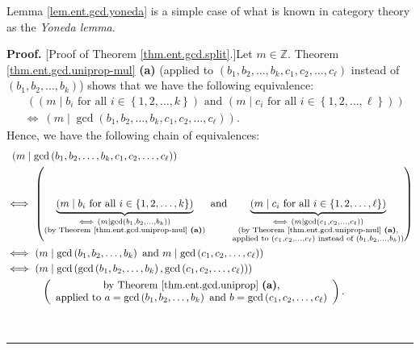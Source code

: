 \documentclass[numbers=enddot,12pt,final,onecolumn,notitlepage]{scrartcl}%
\numberwithin{exer}{subsection}
\theoremstyle{definition}
\newenvironment{proof}[1][Proof]{\noindent\textbf{#1.} }{\ \rule{0.5em}{0.5em}}
\begin{document}
Lemma \ref{lem.ent.gcd.yoneda} is a simple case of what is known in category
theory as the \textit{Yoneda lemma}.

\begin{proof}
[Proof of Theorem \ref{thm.ent.gcd.split}.]Let $m\in\mathbb{Z}$. Theorem
\ref{thm.ent.gcd.uniprop-mul} \textbf{(a)} (applied to $\left(  b_{1}%
,b_{2},\ldots,b_{k},c_{1},c_{2},\ldots,c_{\ell}\right)  $ instead of $\left(
b_{1},b_{2},\ldots,b_{k}\right)  $) shows that we have the following
equivalence:%
\begin{align*}
&  \ \left(  \left(  m\mid b_{i}\text{ for all }i\in\left\{  1,2,\ldots
,k\right\}  \right)  \text{ and }\left(  m\mid c_{i}\text{ for all }%
i\in\left\{  1,2,\ldots,\ell\right\}  \right)  \right) \\
&  \Longleftrightarrow\ \left(  m\mid\gcd\left(  b_{1},b_{2},\ldots
,b_{k},c_{1},c_{2},\ldots,c_{\ell}\right)  \right)  .
\end{align*}
Hence, we have the following chain of equivalences:%
\begin{align*}
&  \ \left(  m\mid\gcd\left(  b_{1},b_{2},\ldots,b_{k},c_{1},c_{2}%
,\ldots,c_{\ell}\right)  \right) \\
&  \Longleftrightarrow\ \left(  \underbrace{\left(  m\mid b_{i}\text{ for all
}i\in\left\{  1,2,\ldots,k\right\}  \right)  }_{\substack{\Longleftrightarrow
\ \left(  m\mid\gcd\left(  b_{1},b_{2},\ldots,b_{k}\right)  \right)
\\\text{(by Theorem \ref{thm.ent.gcd.uniprop-mul} \textbf{(a)})}}}\text{ and
}\underbrace{\left(  m\mid c_{i}\text{ for all }i\in\left\{  1,2,\ldots
,\ell\right\}  \right)  }_{\substack{\Longleftrightarrow\ \left(  m\mid
\gcd\left(  c_{1},c_{2},\ldots,c_{\ell}\right)  \right)  \\\text{(by Theorem
\ref{thm.ent.gcd.uniprop-mul} \textbf{(a)},}\\\text{applied to }\left(
c_{1},c_{2},\ldots,c_{\ell}\right)  \text{ instead of }\left(  b_{1}%
,b_{2},\ldots,b_{k}\right)  \text{)}}}\right) \\
&  \Longleftrightarrow\ \left(  m\mid\gcd\left(  b_{1},b_{2},\ldots
,b_{k}\right)  \text{ and }m\mid\gcd\left(  c_{1},c_{2},\ldots,c_{\ell
}\right)  \right) \\
&  \Longleftrightarrow\ \left(  m\mid\gcd\left(  \gcd\left(  b_{1}%
,b_{2},\ldots,b_{k}\right)  ,\gcd\left(  c_{1},c_{2},\ldots,c_{\ell}\right)
\right)  \right) \\
&  \ \ \ \ \ \ \ \ \ \ \left(
\begin{array}
[c]{c}%
\text{by Theorem \ref{thm.ent.gcd.uniprop} \textbf{(a)},}\\
\text{applied to }a=\gcd\left(  b_{1},b_{2},\ldots,b_{k}\right)  \text{ and
}b=\gcd\left(  c_{1},c_{2},\ldots,c_{\ell}\right)
\end{array}
\right)  .
\end{align*}



\end{proof}
\end{document}
